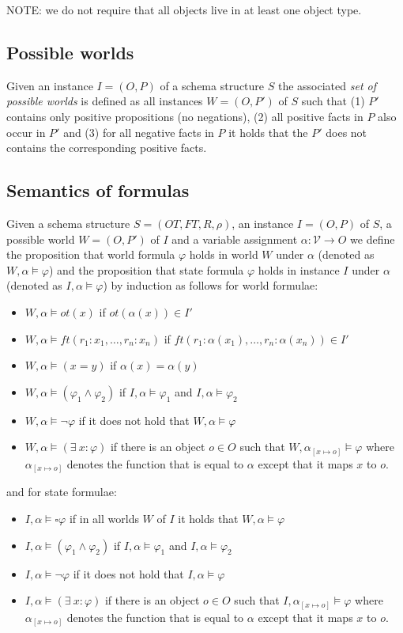 \documentclass[11pt]{amsart}
\newcommand{\always}{\square}
\begin{document}
NOTE: we do not require that all objects live in at least one object type.

\subsection{Possible worlds} Given an instance $I = (O, P)$ of a schema structure $S$ the associated \emph{set of possible worlds} is defined as all instances $W = (O, P')$ of $S$ such that (1) $P'$ contains only positive propositions (no negations), (2) all positive facts in $P$ also occur in $P'$ and (3) for all negative facts in $P$ it holds that the $P'$ does not contains the corresponding positive facts.

\subsection{Semantics of formulas} Given a schema  structure $S = (OT, FT, R, \rho)$, an instance $I = (O, P)$ of $S$, a possible world $W = (O, P')$ of $I$ and a variable assignment $\alpha : \mathcal{V} \to O$ we define the proposition that world formula $\varphi$ holds in world $W$ under $\alpha$ (denoted as $W, \alpha \models \varphi$) and the proposition that state formula $\varphi$ holds in instance $I$ under $\alpha$ (denoted as $I, \alpha \models \varphi$) by induction as follows for world formulae:
\begin{itemize}
  \item $W, \alpha \models ot(x)$ if $ot(\alpha(x)) \in I'$
  \item $W, \alpha \models ft(r_1:x_1, \ldots, r_n:x_n)$ if $ft(r_1 : \alpha(x_1), \ldots, r_n : \alpha(x_n)) \in I'$
  \item $W, \alpha \models (x = y)$ if $\alpha(x) = \alpha(y)$   
  \item $W, \alpha \models (\varphi_1 \wedge \varphi_2)$ if $I, \alpha \models \varphi_1$ and $I, \alpha \models \varphi_2$
  \item $W, \alpha \models \neg\varphi$ if it does not hold that  $W, \alpha \models \varphi$
  \item $W, \alpha \models (\exists\  x : \varphi)$ if there is an object $o \in O$ such that $W, \alpha_{[x \mapsto o]} \models \varphi$ where $\alpha_{[x \mapsto o]}$ denotes the function that is equal to $\alpha$ except that it maps $x$ to $o$.
\end{itemize}
and for state formulae:
\begin{itemize}
  \item $I, \alpha \models \always{\varphi}$ if in all worlds $W$ of $I$ it holds that $W, \alpha \models \varphi$
  \item $I, \alpha \models (\varphi_1 \wedge \varphi_2)$ if $I, \alpha \models \varphi_1$ and $I, \alpha \models \varphi_2$
  \item $I, \alpha \models \neg\varphi$ if it does not hold that  $I, \alpha \models \varphi$
  \item $I, \alpha \models (\exists\  x : \varphi)$ if there is an object $o \in O$ such that $I, \alpha_{[x \mapsto o]} \models \varphi$ where $\alpha_{[x \mapsto o]}$ denotes the function that is equal to $\alpha$ except that it maps $x$ to $o$.
\end{itemize}
\end{document}
